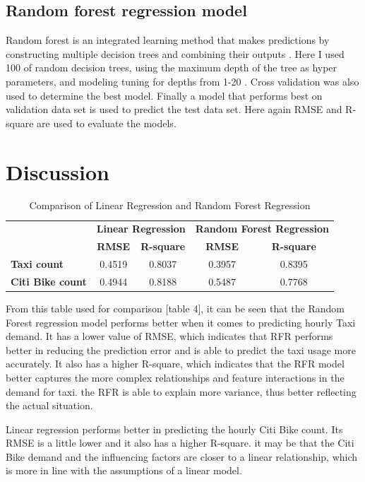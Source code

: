 \documentclass[11pt]{article}
\begin{document}
\subsection{Random forest regression model}
Random forest is an integrated learning method that makes predictions by constructing multiple decision trees and combining their outputs \cite{RFR}. Here I used 100 of random decision trees, using the maximum depth of the tree as hyper parameters, and modeling tuning for depths from 1-20 . Cross validation was also used to determine the best model. Finally a model that performs best on validation data set is used to predict the test data set. Here again RMSE and R-square are used to evaluate the models.

\section{Discussion}
\begin{table}[h!]
\centering
\begin{tabular}{|l|c|c|c|c|}
\hline
\multirow{2}{*}{} & \multicolumn{2}{c|}{\textbf{Linear Regression}} & \multicolumn{2}{c|}{\textbf{Random Forest Regression}} \\ \cline{2-5}
 & \textbf{RMSE} & \textbf{R-square} & \textbf{RMSE} & \textbf{R-square} \\ \hline
\textbf{Taxi count} & 0.4519 & 0.8037 & 0.3957 & 0.8395 \\ \hline
\textbf{Citi Bike count} & 0.4944 & 0.8188 & 0.5487 & 0.7768 \\ \hline
\end{tabular}
\caption{Comparison of Linear Regression and Random Forest Regression}
\label{tab:regression_comparison}
\end{table}
From this table used for comparison [table 4], it can be seen that the Random Forest regression model performs better when it comes to predicting hourly Taxi demand. It has a lower value of RMSE, which indicates that RFR performs better in reducing the prediction error and is able to predict the taxi usage more accurately. It also has a higher R-square, which indicates that the RFR model better captures the more complex relationships and feature interactions in the demand for taxi. the RFR is able to explain more variance, thus better reflecting the actual situation.

Linear regression performs better in predicting the hourly Citi Bike count. Its RMSE is a little lower and it also has a higher R-square. it may be that the Citi Bike demand and the influencing factors are closer to a linear relationship, which is more in line with the assumptions of a linear model.
\end{document}
